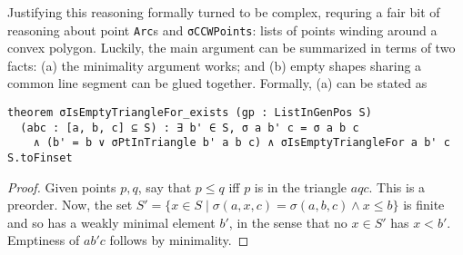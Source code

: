 Justifying this reasoning formally
turned to be complex,
requring a fair bit of reasoning about point \lstinline|Arc|s
and \lstinline|σCCWPoints|: lists of points winding around a convex polygon.
Luckily, the main argument can be summarized in terms of two facts:
(a) the minimality argument works; and
(b) empty shapes sharing a common line segment can be glued together.
Formally, (a) can be stated as

\begin{lstlisting}
theorem σIsEmptyTriangleFor_exists (gp : ListInGenPos S)
  (abc : [a, b, c] ⊆ S) : ∃ b' ∈ S, σ a b' c = σ a b c 
    ∧ (b' = b ∨ σPtInTriangle b' a b c) ∧ σIsEmptyTriangleFor a b' c S.toFinset
\end{lstlisting}
\begin{proof}
  Given points $p,q$, say that $p \leq q$ iff $p$ is in the triangle $aqc$.
  This is a preorder.
  Now, the set $S' = \{x \in S \mid \sigma(a,x,c) = \sigma(a,b,c) \wedge x \leq b\}$
  is finite and so has a weakly minimal element $b'$,
  in the sense that no $x \in S'$ has $x < b'$.
  Emptiness of $ab'c$ follows by minimality.
\end{proof}

